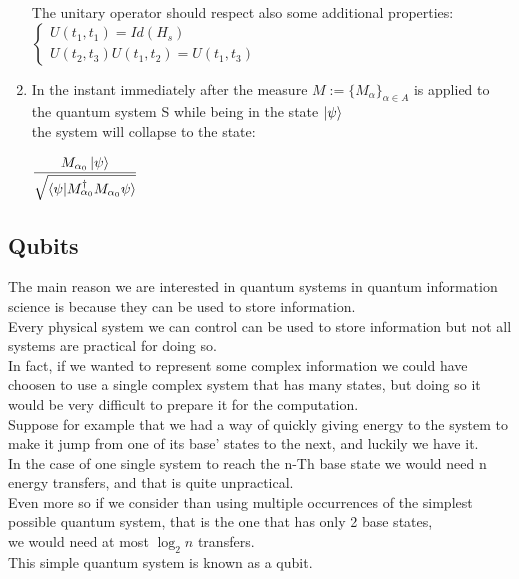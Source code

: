 \documentclass{article}
\begin{document}
\begin{enumerate}
  The unitary operator should respect also some additional
  properties:\\
    $
    \begin{cases}
        U(t_1,t_1) = Id(H_s)\\
        U(t_2,t_3)U(t_1,t_2) = U(t_1,t_3)
    \end{cases} $ 

  \item In the instant immediately after the measure
    $M := \{M_\alpha \}_{\alpha\in A}$ is applied to the quantum
    system S while being in the state $\ket{\psi}$ \\
    the system will collapse to the state:
    
    \begin{center}
      $\dfrac{M_{\alpha_0}\ket\psi}
      {\sqrt{\braket{\psi|M_{\alpha_0}^\dag M_{\alpha_0}\psi}}}$
    \end{center}
\end{enumerate}


\subsection{Qubits}

The main reason we are interested in quantum systems in quantum
information science is because they can be used to store information.\\
Every physical system we can control can be used to store information
but not all systems are practical for doing so. \\
In fact, if we wanted to represent some complex information we
could have choosen to use a single complex system that has many states,
but doing so it would be very difficult to prepare it for the
computation.\\
Suppose for example that we had a way of quickly giving energy
to the system to make it jump from one of its base' states to
the next, and luckily we have it.\\
In the case of one single system to reach the n-Th base state
we would need n energy transfers, and that is quite unpractical.\\
Even more so if we consider than using multiple occurrences of
the simplest possible quantum system, that is the one that
has only 2 base states,\\ we would need at most $\log_2{n}$ transfers.\\
This simple quantum system is known as a qubit.\\
\end{document}
